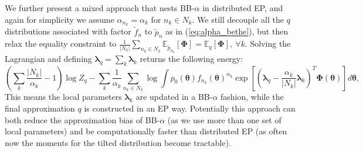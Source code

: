 We further present a mixed approach that nests BB-$\alpha$ in distributed EP, and again for simplicity we assume $\alpha_{n_k} = \alpha_k$ for $n_k \in N_k$. We still decouple all the $q$ distributions associated with factor $\tilde{f}_n$ to $\tilde{p}_{n}$ as in (\ref{eq:alpha_bethe}), but then relax the equality constraint to
$\frac{1}{|N_k|} \sum_{n_k \in N_k} \mathbb{E}_{\tilde{p}_{n_k}}[\bm{\Phi}] = \mathbb{E}_q[\bm{\Phi}], \ \forall k.$
Solving the Lagrangian and defining $\bm{\lambda}_q = \sum_k \bm{\lambda}_k$ returns the following energy:
\begin{equation}
(\sum_k \frac{|N_k|}{\alpha_k} - 1) \log Z_q - \sum_k \frac{1}{\alpha_k} \sum_{n_k \in N_k} \log \int p_0(\bm{\theta}) f_{n_k}(\bm{\theta})^{\alpha_k} \exp \left[ (\bm{\lambda}_q - \frac{\alpha_k}{|N_k|} \bm{\lambda}_k)^T \bm{\Phi}(\bm{\theta}) \right] d \bm{\theta},
\end{equation}
This means the local parameters $\bm{\lambda}_k$ are updated in a BB-$\alpha$ fashion, while the final approximation $q$ is constructed in an EP way. Potentially this approach can both reduce the approximation bias of BB-$\alpha$ (as we use more than one set of local parameters) and be computationally faster than distributed EP (as often now the moments for the tilted distribution become tractable).

